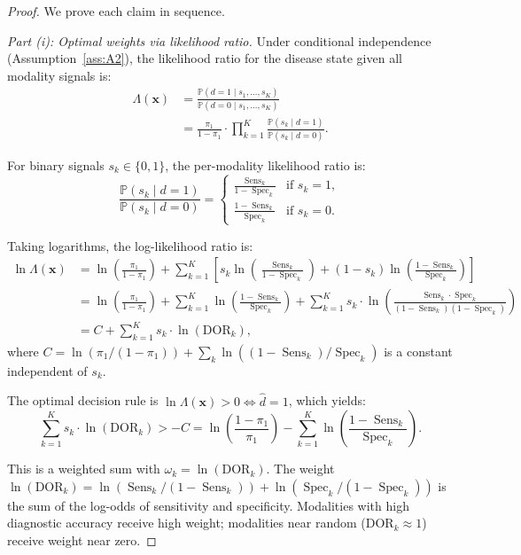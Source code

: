 \documentclass[11pt,a4paper]{article}
\theoremstyle{definition}
\DeclareMathOperator{\Sens}{Sens}
\DeclareMathOperator{\Spec}{Spec}
\newcommand{\Pbb}{\mathbb{P}}
\newcommand{\disease}{d}                       %
\newcommand{\diagnosis}{\hat{d}}               %
\begin{document}
\begin{proof}
We prove each claim in sequence.

\medskip\noindent\textit{Part (i): Optimal weights via likelihood ratio.}
Under conditional independence (Assumption~\ref{ass:A2}), the likelihood
ratio for the disease state given all modality signals is:
\begin{align}
    \Lambda(\mathbf{x}) &= \frac{\Pbb(\disease = 1 \mid s_1, \dots, s_K)}{\Pbb(\disease = 0 \mid s_1, \dots, s_K)} \\
    &= \frac{\pi_1}{1-\pi_1} \cdot \prod_{k=1}^{K} \frac{\Pbb(s_k \mid \disease = 1)}{\Pbb(s_k \mid \disease = 0)}.
\end{align}

For binary signals $s_k \in \{0, 1\}$, the per-modality likelihood ratio is:
\begin{equation}
    \frac{\Pbb(s_k \mid \disease = 1)}{\Pbb(s_k \mid \disease = 0)} =
    \begin{cases}
        \frac{\Sens_k}{1-\Spec_k} & \text{if } s_k = 1,\\[6pt]
        \frac{1-\Sens_k}{\Spec_k} & \text{if } s_k = 0.
    \end{cases}
\end{equation}

Taking logarithms, the log-likelihood ratio is:
\begin{align}
    \ln\Lambda(\mathbf{x}) &= \ln\!\left(\frac{\pi_1}{1-\pi_1}\right)
    + \sum_{k=1}^{K} \left[s_k \ln\!\left(\frac{\Sens_k}{1-\Spec_k}\right)
    + (1-s_k) \ln\!\left(\frac{1-\Sens_k}{\Spec_k}\right)\right] \\
    &= \ln\!\left(\frac{\pi_1}{1-\pi_1}\right) + \sum_{k=1}^{K} \ln\!\left(\frac{1-\Sens_k}{\Spec_k}\right)
    + \sum_{k=1}^{K} s_k \cdot \ln\!\left(\frac{\Sens_k \cdot \Spec_k}{(1-\Sens_k)(1-\Spec_k)}\right) \\
    &= C + \sum_{k=1}^{K} s_k \cdot \ln(\text{DOR}_k),
\end{align}
where $C = \ln(\pi_1/(1-\pi_1)) + \sum_k \ln((1-\Sens_k)/\Spec_k)$ is a
constant independent of $s_k$.

The optimal decision rule is $\ln\Lambda(\mathbf{x}) > 0 \iff \diagnosis = 1$,
which yields:
\begin{equation}
    \sum_{k=1}^{K} s_k \cdot \ln(\text{DOR}_k) > -C = \ln\!\left(\frac{1-\pi_1}{\pi_1}\right) - \sum_{k=1}^{K} \ln\!\left(\frac{1-\Sens_k}{\Spec_k}\right).
\end{equation}

This is a weighted sum with $\omega_k = \ln(\text{DOR}_k)$. The weight
$\ln(\text{DOR}_k) = \ln(\Sens_k/(1-\Sens_k)) + \ln(\Spec_k/(1-\Spec_k))$
is the sum of the log-odds of sensitivity and specificity. Modalities with
high diagnostic accuracy receive high weight; modalities near random
($\text{DOR}_k \approx 1$) receive weight near zero.


\end{proof}
\end{document}
